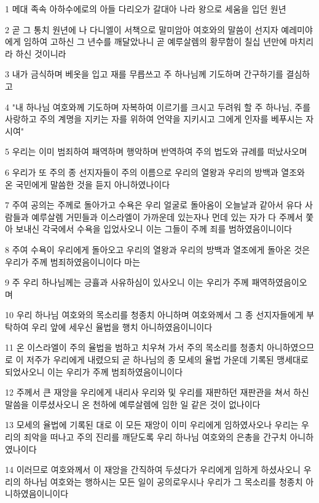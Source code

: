 \par 1 메대 족속 아하수에로의 아들 다리오가 갈대아 나라 왕으로 세움을 입던 원년
\par 2 곧 그 통치 원년에 나 다니엘이 서책으로 말미암아 여호와의 말씀이 선지자 예레미야에게 임하여 고하신 그 년수를 깨달았나니 곧 예루살렘의 황무함이 칠십 년만에 마치리라 하신 것이니라
\par 3 내가 금식하며 베옷을 입고 재를 무릅쓰고 주 하나님께 기도하며 간구하기를 결심하고
\par 4 "내 하나님 여호와께 기도하며 자복하여 이르기를 크시고 두려워 할 주 하나님, 주를 사랑하고 주의 계명을 지키는 자를 위하여 언약을 지키시고 그에게 인자를 베푸시는 자시여"
\par 5 우리는 이미 범죄하여 패역하며 행악하며 반역하여 주의 법도와 규례를 떠났사오며
\par 6 우리가 또 주의 종 선지자들이 주의 이름으로 우리의 열왕과 우리의 방백과 열조와 온 국민에게 말씀한 것을 듣지 아니하였나이다
\par 7 주여 공의는 주께로 돌아가고 수욕은 우리 얼굴로 돌아옴이 오늘날과 같아서 유다 사람들과 예루살렘 거민들과 이스라엘이 가까운데 있는자나 먼데 있는 자가 다 주께서 쫓아 보내신 각국에서 수욕을 입었사오니 이는 그들이 주께 죄를 범하였음이니이다
\par 8 주여 수욕이 우리에게 돌아오고 우리의 열왕과 우리의 방백과 열조에게 돌아온 것은 우리가 주께 범죄하였음이니이다 마는
\par 9 주 우리 하나님께는 긍휼과 사유하심이 있사오니 이는 우리가 주께 패역하였음이오며
\par 10 우리 하나님 여호와의 목소리를 청종치 아니하며 여호와께서 그 종 선지자들에게 부탁하여 우리 앞에 세우신 율법을 행치 아니하였음이니이다
\par 11 온 이스라엘이 주의 율법을 범하고 치우쳐 가서 주의 목소리를 청종치 아니하였으므로 이 저주가 우리에게 내렸으되 곧 하나님의 종 모세의 율법 가운데 기록된 맹세대로 되었사오니 이는 우리가 주께 범죄하였음이니이다
\par 12 주께서 큰 재앙을 우리에게 내리사 우리와 및 우리를 재판하던 재판관을 쳐서 하신 말씀을 이루셨사오니 온 천하에 예루살렘에 임한 일 같은 것이 없나이다
\par 13 모세의 율법에 기록된 대로 이 모든 재앙이 이미 우리에게 임하였사오나 우리는 우리의 죄악을 떠나고 주의 진리를 깨닫도록 우리 하나님 여호와의 은총을 간구치 아니하였나이다
\par 14 이러므로 여호와께서 이 재앙을 간직하여 두셨다가 우리에게 임하게 하셨사오니 우리의 하나님 여호와는 행하시는 모든 일이 공의로우시나 우리가 그 목소리를 청종치 아니하였음이니이다
